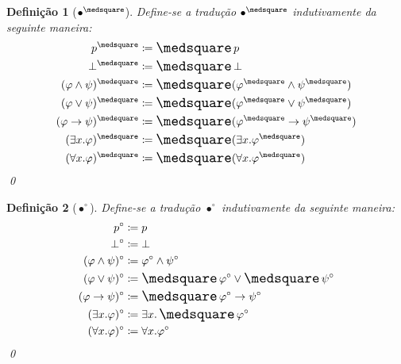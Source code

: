 \documentclass{report}
\newtheorem{definition}{Definição}
\begin{document}
    \begin{definition}[$\bullet^\medsquare$] Define-se a tradução $\bullet^\medsquare$ indutivamente da seguinte maneira:
        \begin{align*}
            p^\medsquare                     & \coloneqq \nec p                                           \\
            \bot^\medsquare                  & \coloneqq \nec \bot                                        \\
            (\varphi \wedge \psi)^\medsquare & \coloneqq \nec (\varphi^\medsquare \wedge \psi^\medsquare) \\
            (\varphi \vee \psi)^\medsquare   & \coloneqq \nec (\varphi^\medsquare \vee \psi^\medsquare)   \\
            (\varphi \to \psi)^\medsquare    & \coloneqq \nec (\varphi^\medsquare \to \psi^\medsquare)    \\
            (\exists x. \varphi)^\medsquare  & \coloneqq \nec (\exists x. \varphi^\medsquare)             \\
            (\forall x. \varphi)^\medsquare  & \coloneqq \nec (\forall x. \varphi^\medsquare)  
        \end{align*}
        \qed
    \end{definition}

    \begin{definition}[$\bullet^\circ$] Define-se a tradução $\bullet^\circ$ indutivamente da seguinte maneira:
        \begin{align*}
            p^\circ                     & \coloneqq p                                       \\
            \bot^\circ                  & \coloneqq \bot                                    \\
            (\varphi \wedge \psi)^\circ & \coloneqq \varphi^\circ \wedge \psi^\circ         \\
            (\varphi \vee \psi)^\circ   & \coloneqq \nec \varphi^\circ \vee \nec \psi^\circ \\
            (\varphi \to \psi)^\circ    & \coloneqq \nec \varphi^\circ \to \psi^\circ       \\
            (\exists x. \varphi)^\circ  & \coloneqq \exists x. \nec \varphi^\circ           \\
            (\forall x. \varphi)^\circ  & \coloneqq \forall x. \varphi^\circ
        \end{align*}
        \qed
    \end{definition}
\end{document}
